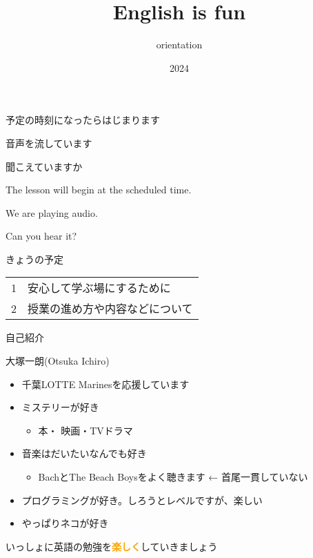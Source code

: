\documentclass[
  ignorenonframetext,
  aspectratio=169,
  xcolor=dvipsnames]{beamer}
\title{English is fun}
\subtitle{orientation}
\author{}
\date{\vspace{-2.5em}2024}
\providecommand{\tightlist}{%
  \setlength{\itemsep}{0pt}\setlength{\parskip}{0pt}}
\begin{document}
\frame{\titlepage}

\begin{frame}{}
\label{section}
\thispagestyle{empty}
\Large

\raggedright

予定の時刻になったらはじまります

\textbullet  音声を流しています

\textbullet  聞こえていますか　

\vfill

\raggedleft

The lesson will begin at the scheduled time.

\vspace{-6pt}

We are playing audio.

\vspace{-6pt}

Can you hear it?
\end{frame}

\begin{frame}{}
\label{section-1}
\thispagestyle{empty}
\titlepage
\end{frame}

\begin{frame}{きょうの予定}
\label{ux304dux3087ux3046ux306eux4e88ux5b9a}
\thispagestyle{empty}
\LARGE

\begin{tabular}{rl}
1&安心して学ぶ場にするために\\
2&授業の進め方や内容などについて
\end{tabular}
\end{frame}

\begin{frame}{自己紹介}
\label{ux81eaux5df1ux7d39ux4ecb}
\thispagestyle{empty}
\Large

\pause

大塚一朗(Otsuka Ichiro)

\pause

\begin{itemize}[<+->]
\tightlist
\item
  千葉LOTTE Marinesを応援しています
\item
  ミステリーが好き

  \begin{itemize}[<+->]
  \tightlist
  \item
    本・ 映画・TVドラマ
  \end{itemize}
\item
  音楽はだいたいなんでも好き

  \begin{itemize}[<+->]
  \tightlist
  \item
    BachとThe Beach Boysをよく聴きます ← 首尾一貫していない
  \end{itemize}
\item
  プログラミングが好き。しろうとレベルですが、楽しい
\item
  やっぱりネコが好き \pause
\end{itemize}

いっしょに英語の勉強を\textcolor{Orange}{\bfseries 楽しく}していきましょう
\end{frame}
\end{document}
